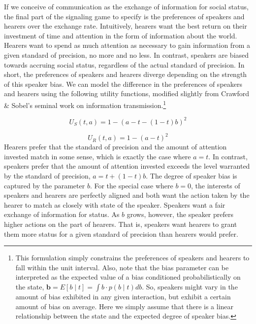 \documentclass[linguex]{sp}
\theoremstyle{definition} \newtheorem{definition}{Definition}
\begin{document}
If we conceive of communication as the exchange of information for social status, the final part of the signaling game to specify is the preferences of speakers and hearers over the exchange rate. Intuitively, hearers want the best return on their investment of time and attention in the form of information about the world. Hearers want to spend as much attention as necessary to gain information from a given standard of precision, no more and no less.  In contrast, speakers are biased towards accruing social status, regardless of the actual standard of precision. In short, the preferences of speakers and hearers diverge depending on the strength of this speaker bias. We can model the difference in the preferences of speakers and hearers using the following utility functions, modified slightly from Crawford \& Sobel's \citeyearpar{crawford-sobel:1982} seminal work on information transmission.\footnote{This formulation simply constrains the preferences of speakers and hearers to fall within the unit interval. Also, note that the bias parameter can be interpreted as the expected value of a bias conditioned probabilistically on the state, $\mathbf{b} = E [ b \mid t] = \int b \cdot p(b \mid t) db$.   So, speakers might vary in the amount of bias exhibited in any given interaction, but exhibit a certain amount of bias on average. Here we simply assume that there is a linear relationship between the state and the expected degree of speaker bias.}

 \begin{equation}
      U_S(t, a) = 1 - (a - t - (1-t)b)^2
      \label{U_S}
 \end{equation}
 
 \begin{equation}
      U_R(t, a) = 1 - (a - t)^2
      \label{U_R}
 \end{equation}
Hearers prefer that the standard of precision and the amount of attention invested match in some sense, which is exactly the case where $a = t$. In contrast, speakers prefer that the amount of attention invested exceeds the level warranted by the standard of precision, $a = t + (1-t)b$.  The degree of speaker bias is captured by the parameter $b$. For the special case where $b=0$, the interests of speakers and hearers are perfectly aligned and both want the action taken by the hearer to match as closely with state of the speaker. Speakers want a fair exchange of information for status.  As $b$ grows, however, the speaker prefers higher actions on the part of hearers. That is, speakers want hearers to grant them more status for a given standard of precision than hearers would prefer. 
\end{document}
